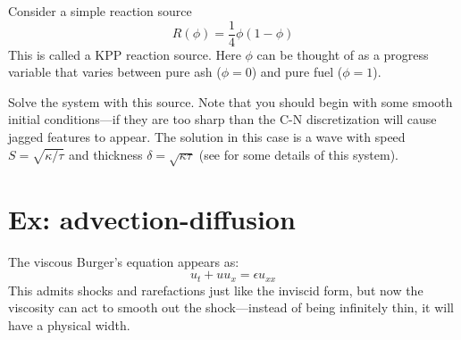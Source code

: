 \begin{exercise}
 Consider a simple reaction source
 \begin{equation}
 R(\phi) = \frac{1}{4} \phi (1 - \phi)
 \end{equation}
 This is called a KPP reaction source.
 Here $\phi$ can be thought of as a progress variable that varies
 between pure ash ($\phi = 0$) and pure fuel ($\phi = 1$).

 Solve the system with this source.  Note that you should begin with
 some smooth initial conditions---if they are too sharp than the 
 C-N discretization will cause jagged features to appear.  
 The solution in this case is a wave with speed $S = \sqrt{\kappa/\tau}$
 and thickness $\delta = \sqrt{\kappa \tau}$ (see \cite{vladimirova2006} for
 some details of this system).
\end{exercise}


\section{Ex: advection-diffusion}

The viscous Burger's equation appears as:
\begin{equation}
u_t + u u_x = \epsilon u_{xx}
\end{equation}
This admits shocks and rarefactions just like the inviscid form, but now
the viscosity can act to smooth out the shock---instead of being
infinitely thin, it will have a physical width.

